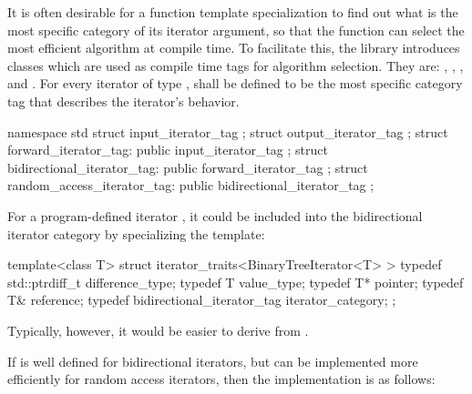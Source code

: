 \pnum
{}%
%
%
%
%
It is often desirable for a
function template specialization
to find out what is the most specific category of its iterator
argument, so that the function can select the most efficient algorithm at compile time.
To facilitate this, the
library introduces
classes which are used as compile time tags for algorithm selection.
They are:
,
,
,
and
.
For every iterator of type
,
shall be defined to be the most specific category tag that describes the
iterator's behavior.

\begin{codeblock}
namespace std {
  struct input_iterator_tag { };
  struct output_iterator_tag { };
  struct forward_iterator_tag: public input_iterator_tag { };
  struct bidirectional_iterator_tag: public forward_iterator_tag { };
  struct random_access_iterator_tag: public bidirectional_iterator_tag { };
}
\end{codeblock}

\pnum
{}%
%
%
%
%
%
\enterexample
For a program-defined iterator
,
it could be included
into the bidirectional iterator category by specializing the
template:

\begin{codeblock}
template<class T> struct iterator_traits<BinaryTreeIterator<T> > {
  typedef std::ptrdiff_t difference_type;
  typedef T value_type;
  typedef T* pointer;
  typedef T& reference;
  typedef bidirectional_iterator_tag iterator_category;
};
\end{codeblock}

Typically, however, it would be easier to derive
from
.
\exitexample

\pnum
\enterexample
If
is well defined for bidirectional iterators, but can be implemented more
efficiently for random access iterators, then the implementation is as follows:

